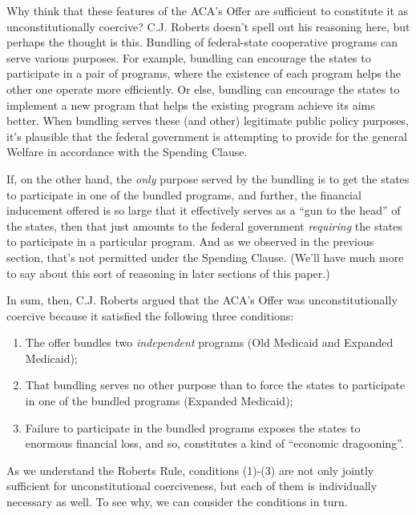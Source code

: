 \documentclass[
  11pt,
  letterpaper,
  DIV=11,
  numbers=noendperiod,
  oneside]{scrartcl}
\begin{document}
Why think that these features of the ACA's Offer are sufficient to
constitute it as unconstitutionally coercive? C.J. Roberts doesn't spell
out his reasoning here, but perhaps the thought is this. Bundling of
federal-state cooperative programs can serve various purposes. For
example, bundling can encourage the states to participate in a pair of
programs, where the existence of each program helps the other one
operate more efficiently. Or else, bundling can encourage the states to
implement a new program that helps the existing program achieve its aims
better. When bundling serves these (and other) legitimate public policy
purposes, it's plausible that the federal government is attempting to
provide for the general Welfare in accordance with the Spending Clause.

If, on the other hand, the \emph{only} purpose served by the bundling is
to get the states to participate in one of the bundled programs, and
further, the financial inducement offered is so large that it
effectively serves as a ``gun to the head'' of the states, then that
just amounts to the federal government \emph{requiring} the states to
participate in a particular program. And as
we observed in the previous section, that's not permitted under the
Spending Clause. (We'll have much more to say about this sort of
reasoning in later sections of this paper.)

In sum, then, C.J. Roberts argued that the ACA's Offer was
unconstitutionally coercive because it satisfied the following three
conditions:

\begin{enumerate}
\def\labelenumi{\arabic{enumi}.}
\item
  The offer bundles two \emph{independent} programs (Old Medicaid and
  Expanded Medicaid);
\item
  That bundling serves no other purpose than to force the states to
  participate in one of the bundled programs (Expanded Medicaid);
\item
  Failure to participate in the bundled programs exposes the states to
  enormous financial loss, and so, constitutes a kind of ``economic
  dragooning''.
\end{enumerate}

As we understand the Roberts Rule, conditions (1)-(3) are not only
jointly sufficient for unconstitutional coerciveness, but each of them
is individually necessary as well. To see why, we can consider the
conditions in turn.
\end{document}
